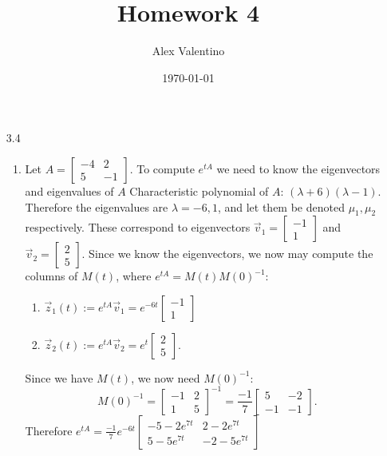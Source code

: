\documentclass[12pt, letterpaper]{article}
\date{\today}
\author{Alex Valentino}
\title{Homework 4}
\begin{document}
\begin{enumerate}
	\item[3.4] 
	\begin{enumerate}
	\item Let $A=\begin{bmatrix} -4 & 2\\ 5 & -1 \end{bmatrix}$. To compute $e^{tA}$ we need to know the eigenvectors and eigenvalues of $A$ 
	Characteristic polynomial of $A$: $(\lambda + 6)(\lambda - 1)$.  
	Therefore the eigenvalues are $\lambda = -6,1$, and let them be denoted $\mu_1, \mu_2$ respectively.
	These correspond to eigenvectors $\Vec{v}_1 = \begin{bmatrix} -1 \\ 1 \end{bmatrix}$ and  $\Vec{v}_2 = \begin{bmatrix} 2 \\ 5 \end{bmatrix}$.  
	Since we know the eigenvectors, we now may compute the columns of $M(t)$, where $e^{tA} = M(t)M(0)^{-1}$:
	\begin{enumerate}
		\item $\Vec{z}_1(t) := e^{tA}\Vec{v}_1 = e^{-6t}\begin{bmatrix} -1 \\ 1 \end{bmatrix}$
		\item $\Vec{z}_2(t) := e^{tA}\Vec{v}_2 = e^{t}\begin{bmatrix} 2 \\ 5 \end{bmatrix}$.
	\end{enumerate}	  
	Since we have $M(t)$, we now need $M(0)^{-1}$:
	$$
		M(0)^{-1} = \begin{bmatrix} -1 & 2 \\ 1 & 5\end{bmatrix}^{-1} = \frac{-1}{7} \begin{bmatrix} 5 & -2 \\ -1 & -1\end{bmatrix}.		
	$$
	Therefore $e^{tA} = \frac{-1}{7} e^{-6t} \begin{bmatrix} -5 -2e^{7t} & 2 - 2e^{7t} \\ 5 - 5e^{7t} & -2 -5e^{7t} \end{bmatrix}$	
	

\end{enumerate}
\end{enumerate}
\end{document}
